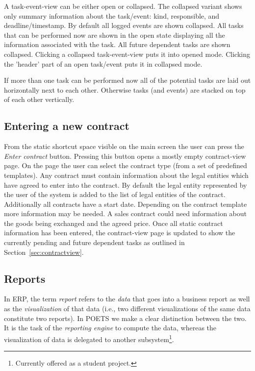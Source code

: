 \documentclass[envcountsame]{llncs}
\begin{document}
A task-event-view can be either open or collapsed. The collapsed
variant shows only summary information about the task/event: kind,
responsible, and deadline/timestamp. By default all logged events are
shown collapsed. All tasks that can be performed now are shown in the
open state displaying all the information associated with the
task. All future dependent tasks are shown collapsed. Clicking a
collapsed task-event-view puts it into opened mode. Clicking the
'header' part of an open task/event puts it in collapsed mode.

If more than one task can be performed now all of the potential tasks
are laid out horizontally next to each other. Otherwise tasks (and
events) are stacked on top of each other vertically.

\subsection{Entering a new contract}
\label{sec:enter-new-contract}

From the static shortcut space visible on the main screen the user can
press the \emph{Enter contract} button. Pressing this button opens a
mostly empty contract-view page. On the page the user can select the
contract type (from a set of predefined templates). Any contract must
contain information about the legal entities which have agreed to
enter into the contract. By default the legal entity represented by
the user of the system is added to the list of legal entities of the
contract. Additionally all contracts have a start date. Depending on
the contract template more information may be needed. A sales contract
could need information about the goods being exchanged and the agreed
price. Once all static contract information has been entered, the
contract-view page is updated to show the currently pending and future
dependent tasks as outlined in Section~\ref{sec:contractview}.

\subsection{Reports}
\label{sec:reports}
In ERP, the term \emph{report} refers to the \emph{data} that goes into a business report
as well as the \emph{visualization} of that data (i.e., two different
visualizations of the same data constitute two reports).  In POETS we
make a clear distinction between the two. It is the task of the
\emph{reporting engine} to compute the data, whereas the visualization
of data is delegated to another subsystem\footnote{Currently offered
  as a student project.}.
\end{document}
